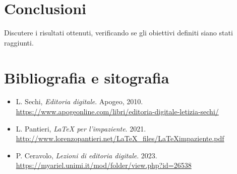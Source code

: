 \documentclass[a4paper,12pt]{article}
\begin{document}
\section*{Conclusioni}
Discutere i risultati ottenuti, verificando se gli obiettivi definiti siano stati raggiunti.

\section*{Bibliografia e sitografia}
\begin{itemize}
    \item L. Sechi, \textit{Editoria digitale}. Apogeo, 2010. \url{https://www.apogeonline.com/libri/editoria-digitale-letizia-sechi/}
    \item L. Pantieri, \textit{LaTeX per l’impaziente}. 2021. \url{http://www.lorenzopantieri.net/LaTeX_files/LaTeXimpaziente.pdf}
    \item P. Ceravolo, \textit{Lezioni di editoria digitale}. 2023. \url{https://myariel.unimi.it/mod/folder/view.php?id=26538}
\end{itemize}
\end{document}
